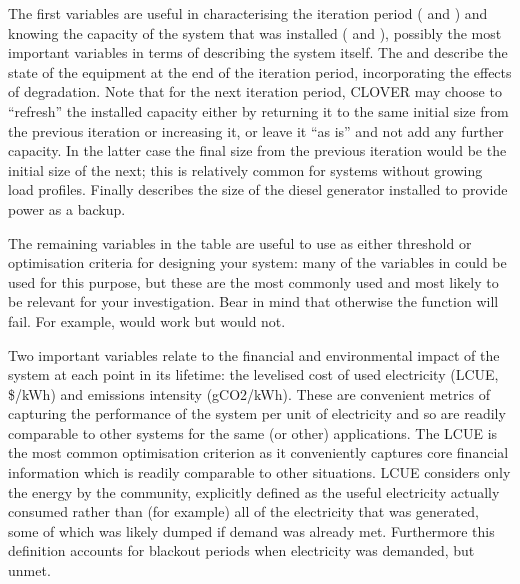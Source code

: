 \documentclass[letterpaper,10pt,english]{sphinxmanual}
\begin{document}
\sphinxAtStartPar
The first variables are useful in characterising the iteration period
( and ) and knowing the capacity of the system
that was installed ( and ),
possibly the most important variables in terms of describing the system
itself. The  and  describe the
state of the equipment at the end of the iteration period, incorporating
the effects of degradation. Note that for the next iteration period,
CLOVER may choose to “refresh” the installed capacity either by
returning it to the same initial size from the previous iteration or
increasing it, or leave it “as is” and not add any further capacity. In
the latter case the final size from the previous iteration would be the
initial size of the next; this is relatively common for systems without
growing load profiles. Finally  describes the size of
the diesel generator installed to provide power as a backup.

\sphinxAtStartPar
The remaining variables in the table are useful to use as either
threshold or optimisation criteria for designing your system: many of
the variables in  could be used for this
purpose, but these are the most commonly used and most likely to be
relevant for your investigation. Bear in mind that 
    otherwise the function will fail. For example,
 would work but  would not.

\sphinxAtStartPar
Two important variables relate to the financial and environmental impact
of the system at each point in its lifetime: the levelised cost of used
electricity (LCUE, \$/kWh) and emissions intensity (gCO2/kWh). These are
convenient metrics of capturing the performance of the system per unit
of electricity and so are readily comparable to other systems for the
same (or other) applications. The LCUE is the most common optimisation
criterion as it conveniently captures core financial information which
is readily comparable to other situations. LCUE considers only the
energy  by the community, explicitly defined as the useful
electricity actually consumed rather than (for example) all of the
electricity that was generated, some of which was likely dumped if
demand was already met. Furthermore this definition accounts for
blackout periods when electricity was demanded, but unmet.
\end{document}
